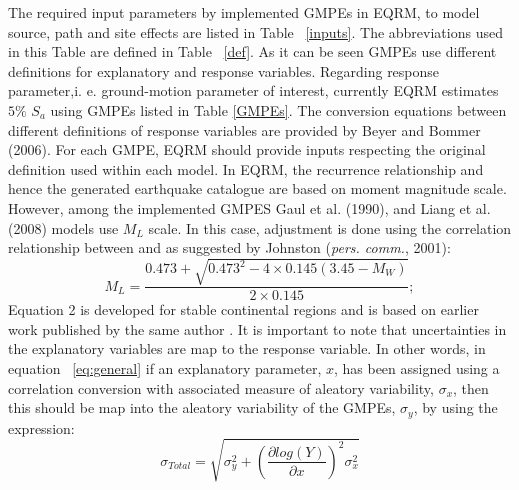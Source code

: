 The required input parameters by implemented GMPEs in EQRM, to model
source, path and site effects are listed in Table ~\ref{inputs}. The
abbreviations used in this Table are defined in Table ~\ref{def}. As
it can be seen GMPEs use different definitions for explanatory and
response variables. Regarding response parameter,i. e. ground-motion
parameter of interest, currently EQRM estimates $5 \%$ $S_a$ using
GMPEs listed in Table \ref{GMPEs}. The conversion equations between
different definitions of response variables are provided by Beyer
and Bommer (2006).  For each GMPE, EQRM should provide inputs
respecting the original definition used within each model. In EQRM,
the recurrence relationship and hence the generated earthquake
catalogue are based on moment magnitude scale. However, among the
implemented GMPES Gaul et al. (1990), and Liang et al. (2008) models
use $M_L$ scale. In this case, adjustment is done using the
correlation relationship between and as suggested by Johnston
(\textit{pers. comm.}, 2001):
\begin{equation}
M_L =
\frac{0.473+\sqrt{0.473^2-4\times0.145(3.45-M_W)}}{2\times0.145};
\end{equation}
Equation 2 is developed for stable continental regions and is based
on earlier work published by the same author
\citep{eqrm_Johnstone96a}. It is important to note that
uncertainties in the explanatory variables are map to the response
variable. In other words, in equation ~\ref{eq:general} if an
explanatory parameter, $x$, has been assigned using a correlation
conversion with associated measure of aleatory variability,
$\sigma_x$, then this should be map into the aleatory variability of
the GMPEs, $\sigma_y$, by using the expression:
\begin{equation}
\sigma_{Total} = \sqrt{\sigma_y^2+(\dfrac{\partial log(Y)}{\partial
x})^2 \sigma_x^2}
\end{equation}
